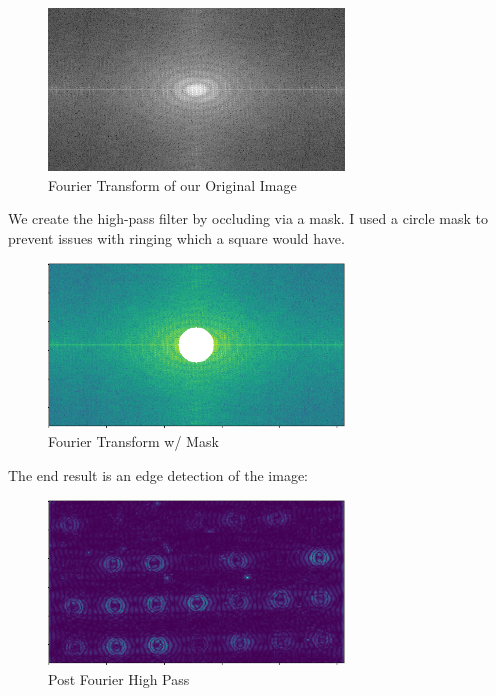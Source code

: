 \documentclass{article}
\begin{document}
\begin{figure}[H]
    \centering
    \includegraphics[width = 0.7\textwidth]{imgs/dft.jpg}
    \caption{Fourier Transform of our Original Image}
    \label{fig:dft}
\end{figure}

We create the high-pass filter by occluding via a mask. I used a circle mask to prevent issues with ringing which a square would have.

\begin{figure}[H]
    \centering
    \includegraphics[width = 0.7\textwidth]{imgs/ftt_mask.png}
    \caption{Fourier Transform w/ Mask}
    \label{fig:mask}
\end{figure}

The end result is an edge detection of the image:

\begin{figure}[H]
    \centering
    \includegraphics[width = 0.7\textwidth]{imgs/ftt_highpass.png}
    \caption{Post Fourier High Pass}
    \label{fig:fourier-edge}
\end{figure}
\end{document}

